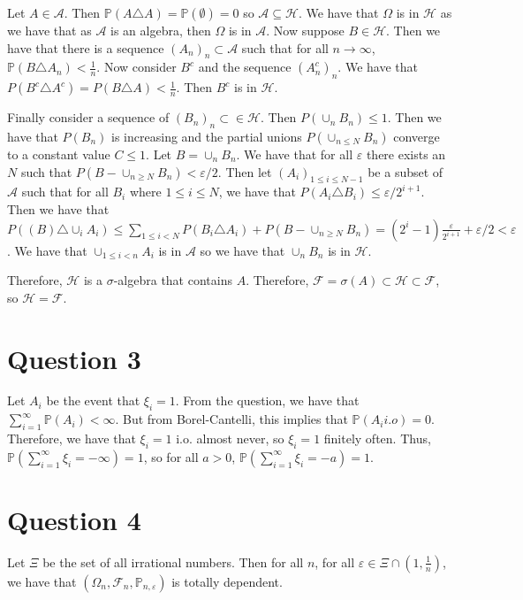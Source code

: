 \documentclass{article}
\theoremstyle{definition}
\numberwithin{theorem}{section}
\numberwithin{equation}{section}
\begin{document}
Let $A \in \mathcal{A}$. Then $\mathbb{P}(A \triangle A) = \mathbb{P}(\emptyset) = 0$ so $\mathcal{A} \subseteq \mathcal{H}$.
We have that $\Omega$ is in $\mathcal{H}$ as we have that as $\mathcal{A}$ is an algebra, then $\Omega$ is in $\mathcal{A}$. Now suppose $B \in \mathcal{H}$. Then we have that there is a sequence $(A_n)_n \subset \mathcal{A}$ such that for all $n \rightarrow \infty$, $\mathbb{P}(B \triangle A_n) < \frac{1}{n}$. 
Now consider $B^c$ and the sequence $(A_n^c)_n$. We have that $P(B^c \triangle A^c) = P(B \triangle A) < \frac{1}{n}$. Then $B^c$ is in $\mathcal{H}$. 


Finally consider a sequence of $(B_n)_n \subset \in \mathcal{H}$. Then $P(\cup_n B_n) \leq 1$. Then we have that $P(B_n)$ is increasing and the partial unions $ P( \cup_{n \leq N} B_n)$ converge to a constant value $C \leq 1$. Let $B = \cup_n B_n$. We have that for all $\varepsilon$ there exists an $N$ such that $P(B - \cup_{n \geq N}B_n) < \varepsilon/2$. Then let $(A_i)_{1 \leq i \leq N - 1}$ be a subset of $\mathcal{A}$ such that for all $B_i$ where $1 \leq i \leq N$, we have that $P(A_i \triangle B_i) \leq \varepsilon/2^{i + 1}$. Then we have that $P((B) \triangle \cup_i A_i ) \leq \sum_{1 \leq i < N} P(B_i \triangle A_i) + P(B - \cup_{n \geq N}B_n) = (2^{i} - 1)\frac{\varepsilon}{2^{i + 1}} + \varepsilon/2 < \varepsilon$. We have that $\cup_{1 \leq i < n} A_i$ is in $\mathcal{A}$ so we have that $\cup_n B_n$ is in $\mathcal{H}$. 

Therefore, $\mathcal{H}$ is a $\sigma$-algebra that contains $A$. Therefore, $\mathcal{F} = \sigma(A) \subset \mathcal{H} \subset \mathcal{F}$, so $\mathcal{H} = \mathcal{F}$.  
\section{Question 3}
Let $A_i$ be the event that $\xi_i= 1$. From the question, we have that $\sum_{i = 1}^{\infty}\mathbb{P}(A_i) < \infty$. But from Borel-Cantelli, this implies that $\mathbb{P}(A_i i.o) = 0$. Therefore, we have that $\xi_i = 1$ i.o. almost never, so $\xi_i = 1$ finitely often. Thus, $\mathbb{P}\left(\sum_{i = 1}^{\infty} \xi_i = - \infty \right) = 1$, so for all $a > 0$, $\mathbb{P}\left(\sum_{i = 1}^{\infty} \xi_i = - a \right) = 1$. 

\section{Question 4}
Let $\Xi$ be the set of all irrational numbers. Then for all $n$, for all $\varepsilon \in \Xi \cap (1, \frac{1}{n})$, we have that $(\Omega_n, \mathcal{F}_n, \mathbb{P}_{n, \varepsilon})$ is totally dependent. 
\end{document}
